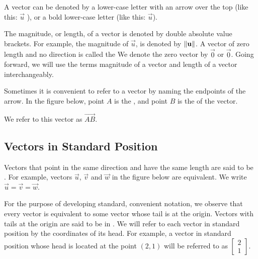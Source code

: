 \documentclass{ximera}
\begin{document}
A vector can be denoted by a lower-case letter with an arrow over the top (like this: $\overrightarrow{u}$ ), or a bold lower-case letter (like this: $\vec{u}$).  

The magnitude, or length, of a vector is denoted by double absolute value brackets.  For example, the magnitude of $\vec{u}$, is denoted by $\left\lVert\mathbf{u}\right\rVert$.  A vector of zero length and no direction is called the  We denote the zero vector by $\overrightarrow{0}$ or $\vec{0}$.  Going forward, we will use the terms magnitude of a vector and length of a vector interchangeably.

Sometimes it is convenient to refer to a vector by naming  the endpoints of the arrow.  In the figure below, point $A$ is the , and point $B$ is the  of the vector.  
\begin{center}
\end{center}
We refer to this vector as $\overrightarrow{AB}$.

\subsection*{Vectors in Standard Position}
Vectors that point in the same direction and have the same length are said to be .  For example, vectors  $\vec{u}$, $\vec{v}$ and $\vec{w}$ in the figure below are equivalent.  We write $\vec{u}=\vec{v}=\vec{w}$.

 \begin{center}
\end{center}
 
For the purpose of developing standard, convenient notation, we observe that every vector is equivalent to some vector whose tail is at the origin.  Vectors with tails at the origin are said to be in .  We will refer to each vector in standard position by the coordinates of its head.   For example, a vector in standard position whose head is located at the point $(2, 1)$ will be referred to as $\begin{bmatrix}2\\1\end{bmatrix}$.  
\end{document}
